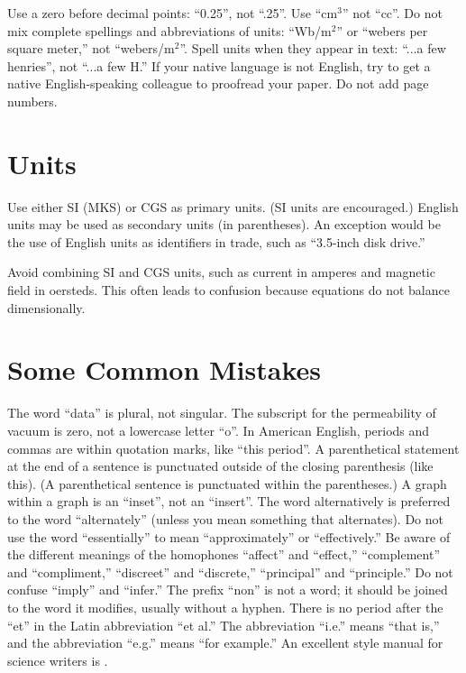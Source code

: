Use a zero before decimal points: ``0.25'', not ``.25''. Use ``cm$^{3}$''
not ``cc''. Do not mix complete spellings and abbreviations of units:
``Wb/m$^{2}$'' or ``webers per square meter,'' not ``webers/m$^{2}$''.
Spell units when they appear in text: ``...a few henries'', not ``...a few
H.'' If your native language is not English, try to get a native
English-speaking colleague to proofread your paper. Do not add page
numbers.

\section{Units}

Use either SI (MKS) or CGS as primary units. (SI units are encouraged.)
English units may be used as secondary units (in parentheses). An
exception would be the use of English units as identifiers in trade, such
as ``3.5-inch disk drive.''

Avoid combining SI and CGS units, such as current in amperes and magnetic
field in oersteds. This often leads to confusion because equations do not
balance dimensionally.


\section{Some Common Mistakes}

The word ``data'' is plural, not singular. The subscript for the
permeability of vacuum is zero, not a lowercase letter ``o''. In American
English, periods and commas are within quotation marks, like ``this
period''. A parenthetical statement at the end of a sentence is punctuated
outside of the closing parenthesis (like this). (A parenthetical sentence
is punctuated within the parentheses.) A graph within a graph is an
``inset'', not an ``insert''. The word alternatively is preferred to the
word ``alternately'' (unless you mean something that alternates). Do not
use the word ``essentially'' to mean ``approximately'' or ``effectively.''
Be aware of the different meanings of the homophones  ``affect'' and
``effect,'' ``complement'' and ``compliment,'' ``discreet'' and
``discrete,'' ``principal'' and ``principle.'' Do not confuse ``imply''
and ``infer.'' The prefix ``non'' is not a word; it should be joined to
the word it modifies, usually without a hyphen. There is no period after
the ``et'' in the Latin abbreviation ``et al.'' The abbreviation ``i.e.''
means ``that is,'' and the abbreviation ``e.g.'' means ``for example.'' An
excellent style manual for science writers is \cite{young}.



